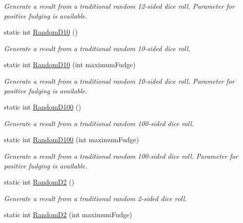 \begin{DoxyCompactItemize}
\begin{DoxyCompactList}\small\item\em Generate a result from a traditional random 12-\/sided dice roll. Parameter for positive fudging is available. \end{DoxyCompactList}\item 
static int \mbox{\hyperlink{class_bigfoot_d_s_1_1_bigfoot_dice_and_coins_a5ac73a488910e9de5b8be7763ec4dbdd}{Random\+D10}} ()
\begin{DoxyCompactList}\small\item\em Generate a result from a traditional random 10-\/sided dice roll. \end{DoxyCompactList}\item 
static int \mbox{\hyperlink{class_bigfoot_d_s_1_1_bigfoot_dice_and_coins_a1b6f0df165f0f040853099e294e1330f}{Random\+D10}} (int maximum\+Fudge)
\begin{DoxyCompactList}\small\item\em Generate a result from a traditional random 10-\/sided dice roll. Parameter for positive fudging is available. \end{DoxyCompactList}\item 
static int \mbox{\hyperlink{class_bigfoot_d_s_1_1_bigfoot_dice_and_coins_af70fd36e549d8b24cb9f6a0bf65420c4}{Random\+D100}} ()
\begin{DoxyCompactList}\small\item\em Generate a result from a traditional random 100-\/sided dice roll. \end{DoxyCompactList}\item 
static int \mbox{\hyperlink{class_bigfoot_d_s_1_1_bigfoot_dice_and_coins_a1adc13a0780aa138b796f4674d2e4eda}{Random\+D100}} (int maximum\+Fudge)
\begin{DoxyCompactList}\small\item\em Generate a result from a traditional random 100-\/sided dice roll. Parameter for positive fudging is available. \end{DoxyCompactList}\item 
static int \mbox{\hyperlink{class_bigfoot_d_s_1_1_bigfoot_dice_and_coins_a2733fdae70917bee5060cd4acbf338ab}{Random\+D2}} ()
\begin{DoxyCompactList}\small\item\em Generate a result from a traditional random 2-\/sided dice roll. \end{DoxyCompactList}\item 
static int \mbox{\hyperlink{class_bigfoot_d_s_1_1_bigfoot_dice_and_coins_a1733e6410ac74e8bf64a053d6c52d898}{Random\+D2}} (int maximum\+Fudge)

\end{DoxyCompactItemize}
